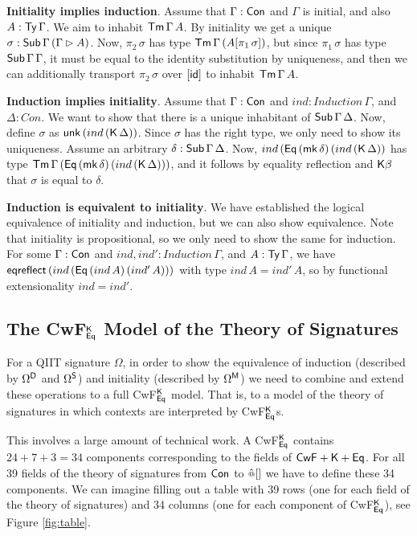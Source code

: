 \documentclass[acmsmall,screen]{acmart}
\begin{document}
\textbf{Initiality implies induction}. Assume that $\Gamma : \Con$ and
$\Gamma$ is initial, and also $A : \Ty\,\Gamma$. We aim to inhabit
$\Tm\,\Gamma\,A$. By initiality we get a unique $\sigma :
\Sub\,\Gamma\,(\Gamma \rhd A)$. Now, $\pi_2\,\sigma$ has type
$\Tm\,\Gamma\,(A[\pi_1\,\sigma])$, but since $\pi_1\,\sigma$ has type
$\Tms\,\Gamma\,\Gamma$, it must be equal to the identity substitution
by uniqueness, and then we can additionally transport
$\pi_2\,\sigma$ over $[\id]$ to inhabit $\Tm\,\Gamma\,A$.

\textbf{Induction implies initiality}. Assume that $\Gamma : \Con$ and
$ind : Induction\,\Gamma$, and $\Delta : Con$. We want to show that
there is a unique inhabitant of $\Tms\,\Gamma\,\Delta$. Now, define
$\sigma$ as $\unk\,(ind\,(\K\,\Delta))$. Since $\sigma$ has the right
type, we only need to show its uniqueness. Assume an arbitrary $\delta
: \Tms\,\Gamma\,\Delta$. Now,
$ind\,(\Eq\,(\mk\,\delta)\,(ind\,(\K\,\Delta))$ has type
$\Tm\,\Gamma\,(\Eq\,(\mk\,\delta)\,(ind\,(\K\,\Delta)))$, and it
follows by equality reflection and $\K\beta$ that $\sigma$ is equal to
$\delta$.

\textbf{Induction is equivalent to initiality}. We have established
the logical equivalence of initiality and induction, but we can also
show equivalence. Note that initiality is propositional, so we only
need to show the same for induction. For some $\Gamma : \Con$ and
$ind, ind' : Induction\,\Gamma$, and $A : \Ty\,\Gamma$, we have
$\eqreflect\,(ind\,(\Eq\,(ind\,A)\,(ind'\,A)))$ with type $ind\,A =
ind'\,A$, so by functional extensionality $ind = ind'$.

\subsection{The CwF$^\K_{\Eq}$ Model of the Theory of Signatures}
\label{sec:cwfmodel}

For a QIIT signature $\Omega$, in order to show the equivalence of
induction (described by $\Omega^\D$ and $\Omega^\S$) and initiality
(described by $\Omega^\M$) we need to combine and extend these
operations to a full CwF$^\K_{\Eq}$ model. That is, to a model of the
theory of signatures in which contexts are interpreted by
CwF$^\K_{\Eq}$s.

This involves a large amount of technical work. A CwF$^\K_{\Eq}$
contains $24+7+3=34$ components corresponding to the fields of
$\mathsf{CwF}+\K+\Eq$. For all 39 fields of the theory of signatures
from $\Con$ to ${\appm[]}$ we have to define these 34 components. We
can imagine filling out a table with 39 rows (one for each field of
the theory of signatures) and 34 columns (one for each component of
CwF$^\K_{\Eq}$), see Figure \ref{fig:table}.
\end{document}
